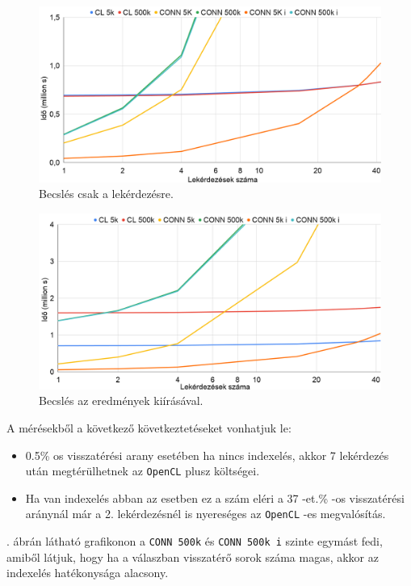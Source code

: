 \begin{figure}[h!]
\centering
\includegraphics[width=\textwidth]{images/test/where3.png}
\caption{Becslés csak a lekérdezésre.}
\label{fig:where}
\end{figure}

\begin{figure}[h!]
\centering
\includegraphics[width=\textwidth]{images/test/where_write3.png}
\caption{Becslés az eredmények kiírásával.}
\label{fig:where_write}
\end{figure}

A mérésekből a következő következtetéseket vonhatjuk le:
\begin{itemize}
	\item 0.5\% os visszatérési arany esetében ha nincs indexelés, akkor 7 lekérdezés után megtérülhetnek az \texttt{OpenCL} plusz költségei.
	\item Ha van indexelés abban az esetben ez a szám eléri a 37 -et.\% -os visszatérési aránynál már a 2. lekérdezésnél is nyereséges az \texttt{OpenCL} -es megvalósítás. 
\end{itemize}

. ábrán látható grafikonon a \texttt{CONN 500k} és \texttt{CONN 500k i} szinte egymást fedi, amiből látjuk, hogy ha a válaszban visszatérő sorok száma magas, akkor az indexelés hatékonysága alacsony.

